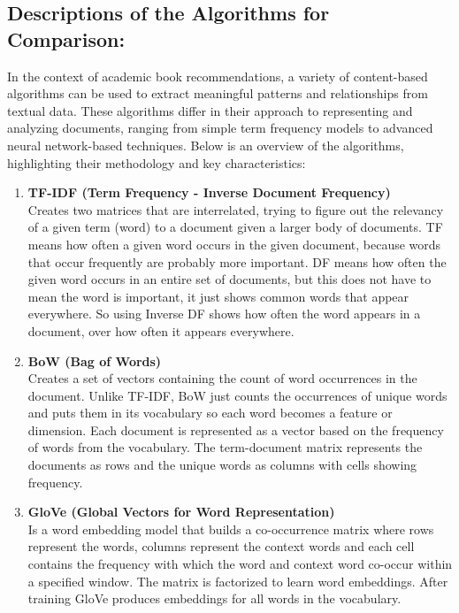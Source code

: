 \documentclass[\myFontSize,oneside,english,hidelinks,a4paper]{article}
\begin{document}
\subsection{Descriptions of the Algorithms for Comparison:}
In the context of academic book recommendations, a variety of content-based algorithms can be used to extract meaningful patterns and relationships from textual data. These algorithms differ in their approach to representing and analyzing documents, ranging from simple term frequency models to advanced neural network-based techniques. Below is an overview of the algorithms, highlighting their methodology and key characteristics:
\begin{enumerate}
\item \textbf{TF-IDF (Term Frequency - Inverse Document Frequency)}\\
Creates two matrices that are interrelated, trying to figure out the relevancy of a given term (word) to a document given a larger body of documents.
TF means how often a given word occurs in the given document, because words that occur frequently are probably more important.
DF means how often the given word occurs in an entire set of documents, but this does not have to mean the word is important, it just shows common words that appear everywhere. So using Inverse DF shows how often the word appears in a document, over how often it appears everywhere.

\item \textbf{BoW (Bag of Words)}\\
Creates a set of vectors containing the count of word occurrences in the document. Unlike TF-IDF, BoW just counts the occurrences of unique words and puts them in its vocabulary so each word becomes a feature or dimension. Each document is represented as a vector based on the frequency of words from the vocabulary. The term-document matrix represents the documents as rows and the unique words as columns with cells showing frequency.
 
\item \textbf{GloVe (Global Vectors for Word Representation)}\\
Is a word embedding model that builds a co-occurrence matrix where rows represent the words, columns represent the context words and each cell contains the frequency with which the word and context word co-occur within a specified window. The matrix is factorized to learn word embeddings. After training GloVe produces embeddings for all words in the vocabulary.


\end{enumerate}
\end{document}
